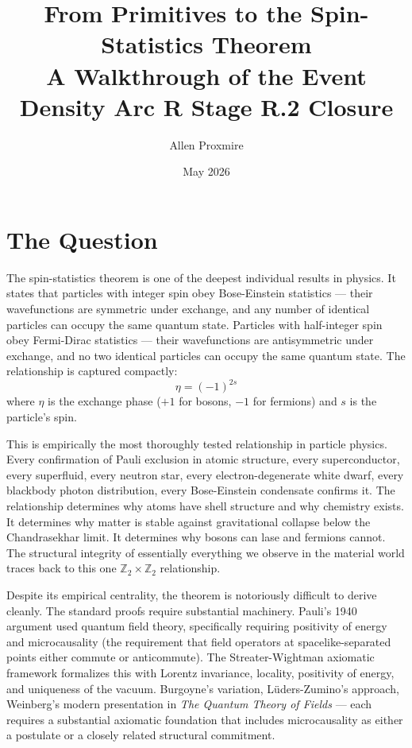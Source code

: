 \documentclass[11pt,a4paper]{article}
\title{\vspace{-1cm}\Large\bfseries From Primitives to the Spin-Statistics Theorem\\[6pt]
\large\mdseries A Walkthrough of the Event Density Arc R Stage R.2 Closure}
\author{Allen Proxmire}
\date{May 2026}
\begin{document}
\maketitle

\section{The Question}

The spin-statistics theorem is one of the deepest individual results in physics. It states that particles with integer spin obey Bose-Einstein statistics --- their wavefunctions are symmetric under exchange, and any number of identical particles can occupy the same quantum state. Particles with half-integer spin obey Fermi-Dirac statistics --- their wavefunctions are antisymmetric under exchange, and no two identical particles can occupy the same quantum state. The relationship is captured compactly:
\[
\eta = (-1)^{2s}
\]
where $\eta$ is the exchange phase ($+1$ for bosons, $-1$ for fermions) and $s$ is the particle's spin.

This is empirically the most thoroughly tested relationship in particle physics. Every confirmation of Pauli exclusion in atomic structure, every superconductor, every superfluid, every neutron star, every electron-degenerate white dwarf, every blackbody photon distribution, every Bose-Einstein condensate confirms it. The relationship determines why atoms have shell structure and why chemistry exists. It determines why matter is stable against gravitational collapse below the Chandrasekhar limit. It determines why bosons can lase and fermions cannot. The structural integrity of essentially everything we observe in the material world traces back to this one $\mathbb{Z}_2 \times \mathbb{Z}_2$ relationship.

Despite its empirical centrality, the theorem is notoriously difficult to derive cleanly. The standard proofs require substantial machinery. Pauli's 1940 argument used quantum field theory, specifically requiring positivity of energy and microcausality (the requirement that field operators at spacelike-separated points either commute or anticommute). The Streater-Wightman axiomatic framework formalizes this with Lorentz invariance, locality, positivity of energy, and uniqueness of the vacuum. Burgoyne's variation, L\"uders-Zumino's approach, Weinberg's modern presentation in \textit{The Quantum Theory of Fields} --- each requires a substantial axiomatic foundation that includes microcausality as either a postulate or a closely related structural commitment.
\end{document}
